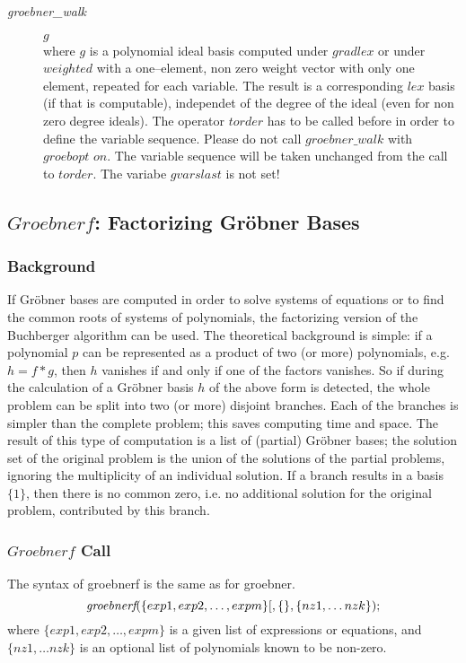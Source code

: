 \begin{description}
\item[{\it groebner\_walk}] $g$\\
where $g$ is a polynomial ideal basis computed under $gradlex$ or under
$weighted$ with a one--element, non zero weight vector with only one
element, repeated for each variable. The result is a corresponding
$lex$ basis (if that is computable), independet of the degree of the
ideal (even for non zero degree ideals).
The operator $torder$ has to be called before in order to define the
variable sequence.  Please do not call $groebner\_walk$ with $groebopt$
$on$. The variable sequence will be taken unchanged from the call to
$torder$. The variabe $gvarslast$ is not set!
\end{description}

\subsection{$Groebnerf$: Factorizing Gr\"obner Bases}

\subsubsection{Background}
If Gr\"obner bases are computed in order to solve systems of
equations or to find the common roots of systems of polynomials,
the factorizing version of the Buchberger algorithm can be used.
The theoretical background is simple: if a polynomial $p$ can be
represented as a product of two (or more) polynomials, e.g. $h= f*g$,
then $h$ vanishes if and only if one of the factors vanishes. So if
during the calculation of a Gr\"obner basis $h$ of the above form is
detected, the whole problem can be split into two (or more)
disjoint branches. Each of the branches is simpler than the complete
problem; this saves computing time and space. The result of this
type of computation is a list of (partial) Gr\"obner bases; the
solution set of the original problem is the union of the solutions of
the partial problems, ignoring the multiplicity of an individual
solution. If a branch results in a basis $\{1\}$, then there is no
common zero, i.e. no additional solution for the original problem,
contributed by this branch.

\subsubsection{$Groebnerf$ Call}
The syntax of groebnerf is the same as for groebner.
\[ \mbox{\it groebnerf}(\{exp1, exp2, \ldots , expm\}
         [,\{\},\{nz1, \ldots nzk\}); \]
where $\{exp1, exp2, \ldots , expm\} $ is a given list of expressions or
equations, and $\{nz1, \ldots nzk\}$ is
an optional list of polynomials known to be non-zero.

